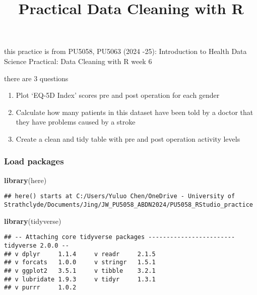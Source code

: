 \documentclass[
]{article}
\title{Practical Data Cleaning with R}
\author{}
\date{\vspace{-2.5em}}
\newenvironment{Shaded}{\begin{snugshade}}{\end{snugshade}}
\newcommand{\FunctionTok}[1]{\textcolor[rgb]{0.13,0.29,0.53}{\textbf{#1}}}
\newcommand{\NormalTok}[1]{#1}
\begin{document}
\maketitle

this practice is from PU5058, PU5063 (2024 -25): Introduction to Health
Data Science Practical: Data Cleaning with R week 6

there are 3 questions

\begin{enumerate}
\def\labelenumi{\arabic{enumi}.}
\item
  Plot `EQ-5D Index' scores pre and post operation for each gender
\item
  Calculate how many patients in this dataset have been told by a doctor
  that they have problems caused by a stroke
\item
  Create a clean and tidy table with pre and post operation activity
  levels
\end{enumerate}

\subsubsection{Load packages}\label{load-packages}

\begin{Shaded}
\begin{Highlighting}[]
\FunctionTok{library}\NormalTok{(here)}
\end{Highlighting}
\end{Shaded}

\begin{verbatim}
## here() starts at C:/Users/Yuluo Chen/OneDrive - University of Strathclyde/Documents/Jing/JW_PU5058_ABDN2024/PU5058_RStudio_practice
\end{verbatim}

\begin{Shaded}
\begin{Highlighting}[]
\FunctionTok{library}\NormalTok{(tidyverse)}
\end{Highlighting}
\end{Shaded}

\begin{verbatim}
## -- Attaching core tidyverse packages ------------------------ tidyverse 2.0.0 --
## v dplyr     1.1.4     v readr     2.1.5
## v forcats   1.0.0     v stringr   1.5.1
## v ggplot2   3.5.1     v tibble    3.2.1
## v lubridate 1.9.3     v tidyr     1.3.1
## v purrr     1.0.2
\end{verbatim}
\end{document}
